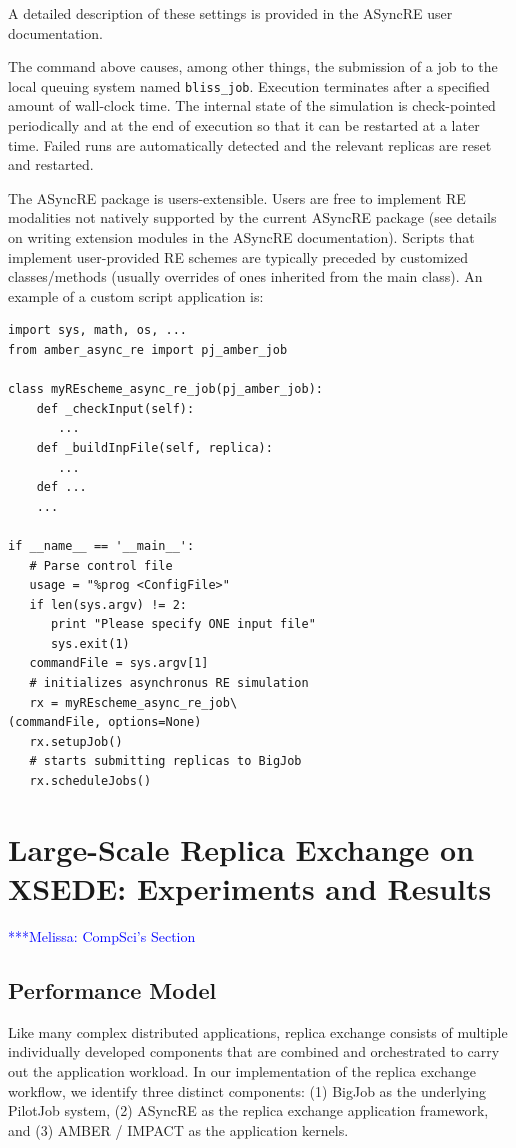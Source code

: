 \documentclass{sig-alternate}
\newcommand{\mrnote}[1]{ {\textcolor{blue} { ***Melissa: #1 }}}
\begin{document}
A detailed description of these settings is provided in the ASyncRE user documentation.


The command above causes, among other things, the submission of a job
to the local queuing system named \verb+bliss_job+. Execution terminates after a specified amount of
wall-clock time. The internal state of the simulation is check-pointed
periodically and at the end of execution so that it can be restarted
at a later time. Failed runs are automatically detected
and the relevant replicas are reset and restarted.

The ASyncRE package is users-extensible. Users are free to implement
RE modalities not natively supported by the current ASyncRE package
(see details on writing extension modules in the ASyncRE
documentation). Scripts that implement user-provided RE schemes are
typically preceded by customized classes/methods (usually overrides of
ones inherited from the main class). An example of a custom script application is:

\begin{lstlisting}[frame=single]
import sys, math, os, ...
from amber_async_re import pj_amber_job

class myREscheme_async_re_job(pj_amber_job):
    def _checkInput(self):
       ...
    def _buildInpFile(self, replica):
       ...
    def ...
    ...

if __name__ == '__main__':
   # Parse control file
   usage = "%prog <ConfigFile>"
   if len(sys.argv) != 2:
      print "Please specify ONE input file"
      sys.exit(1)    
   commandFile = sys.argv[1]
   # initializes asynchronus RE simulation
   rx = myREscheme_async_re_job\
(commandFile, options=None)
   rx.setupJob()
   # starts submitting replicas to BigJob
   rx.scheduleJobs()
\end{lstlisting}





\section{Large-Scale Replica Exchange on XSEDE: Experiments and
  Results}\label{sec:results}
\mrnote{ CompSci's Section}

\subsection{Performance Model}

Like many complex distributed applications, replica exchange consists of
multiple individually developed components that are combined and orchestrated to
carry out the application workload. In our implementation of the replica
exchange workflow, we identify three distinct  components: (1) BigJob as the
underlying PilotJob system, (2) ASyncRE as  the replica exchange application
framework, and (3) AMBER / IMPACT as the  application kernels.
\end{document}
